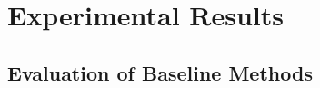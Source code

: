 \section{Experimental Results}
\label{section:exp}
\subsection{Evaluation of Baseline Methods}
\label{section:exp:baseline}